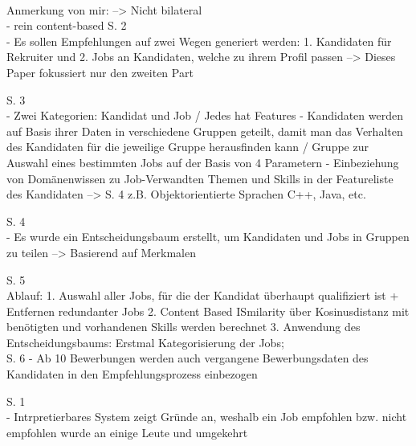 \textcite{applyingDataMining:2014}\\
Anmerkung von mir: --> Nicht bilateral\\
- rein content-based
S. 2\\
- Es sollen Empfehlungen auf zwei Wegen generiert werden: 1. Kandidaten für Rekruiter und 2. Jobs an Kandidaten, welche zu ihrem Profil passen --> Dieses Paper fokussiert nur den zweiten Part

S. 3\\
- Zwei Kategorien: Kandidat und Job / Jedes hat Features
- Kandidaten werden auf Basis ihrer Daten in verschiedene Gruppen geteilt, damit man das Verhalten des Kandidaten für die jeweilige Gruppe herausfinden kann / Gruppe zur Auswahl eines bestimmten Jobs auf der Basis von 4 Parametern
- Einbeziehung von Domänenwissen zu Job-Verwandten Themen und Skills in der Featureliste des Kandidaten --> S. 4 z.B. Objektorientierte Sprachen C++, Java, etc.

S. 4\\
- Es wurde ein Entscheidungsbaum erstellt, um Kandidaten und Jobs in Gruppen zu teilen --> Basierend auf Merkmalen

S. 5\\
Ablauf:
1. Auswahl aller Jobs, für die der Kandidat überhaupt qualifiziert ist + Entfernen redundanter Jobs
2. Content Based ISmilarity über Kosinusdistanz mit benötigten und vorhandenen Skills werden berechnet
3. Anwendung des Entscheidungsbaums: Erstmal Kategorisierung der Jobs; \\

S. 6
- Ab 10 Bewerbungen werden auch vergangene Bewerbungsdaten des Kandidaten in den Empfehlungsprozess einbezogen

\textcite{le:2019}
S. 1\\
- Intrpretierbares System zeigt Gründe an, weshalb ein Job empfohlen bzw. nicht empfohlen wurde an einige Leute und umgekehrt

